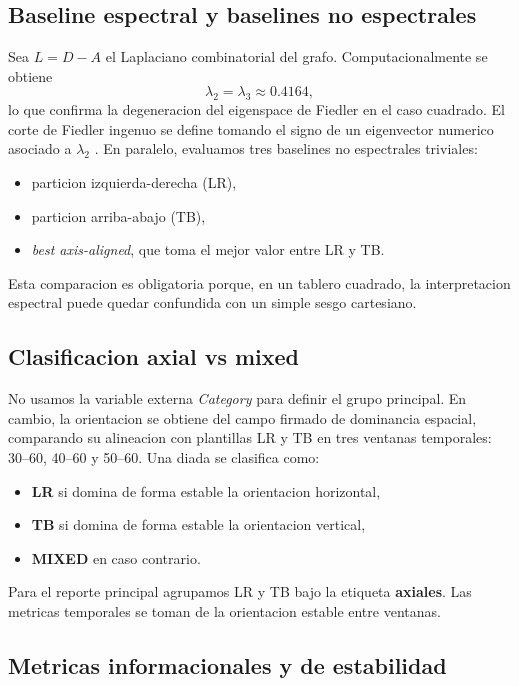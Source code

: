 \documentclass[conference]{IEEEtran}
\begin{document}
\subsection{Baseline espectral y baselines no espectrales}

Sea $L=D-A$ el Laplaciano combinatorial del grafo. Computacionalmente se obtiene
\[
\lambda_2=\lambda_3\approx 0.4164,
\]
lo que confirma la degeneracion del eigenspace de Fiedler en el caso cuadrado. El corte de Fiedler ingenuo se define tomando el signo de un eigenvector numerico asociado a $\lambda_2$ \cite{fiedler1973,vonluxburg2007}. En paralelo, evaluamos tres baselines no espectrales triviales:
\begin{itemize}
\item particion izquierda-derecha (LR),
\item particion arriba-abajo (TB),
\item \emph{best axis-aligned}, que toma el mejor valor entre LR y TB.
\end{itemize}

Esta comparacion es obligatoria porque, en un tablero cuadrado, la interpretacion espectral puede quedar confundida con un simple sesgo cartesiano.

\subsection{Clasificacion axial vs mixed}

No usamos la variable externa \textit{Category} para definir el grupo principal. En cambio, la orientacion se obtiene del campo firmado de dominancia espacial, comparando su alineacion con plantillas LR y TB en tres ventanas temporales: 30--60, 40--60 y 50--60. Una diada se clasifica como:
\begin{itemize}
\item \textbf{LR} si domina de forma estable la orientacion horizontal,
\item \textbf{TB} si domina de forma estable la orientacion vertical,
\item \textbf{MIXED} en caso contrario.
\end{itemize}

Para el reporte principal agrupamos LR y TB bajo la etiqueta \textbf{axiales}. Las metricas temporales se toman de la orientacion estable entre ventanas.

\subsection{Metricas informacionales y de estabilidad}
\end{document}
